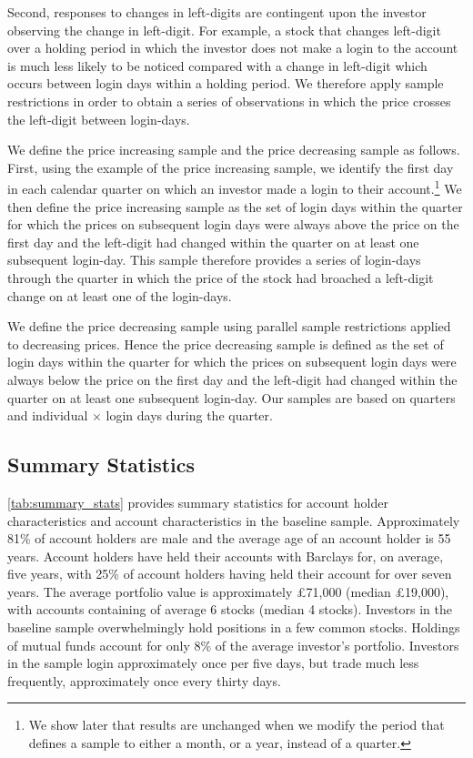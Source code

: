 Second, responses to changes in left-digits are contingent upon the investor observing the change in left-digit. For example, a stock that changes left-digit over a holding period in which the investor does not make a login to the account is much less likely to be noticed compared with a change in left-digit which occurs between login days within a holding period. We therefore apply sample restrictions in order to obtain a series of observations in which the price crosses the left-digit between login-days.

We define the price increasing sample and the price decreasing sample as follows. First, using the example of the price increasing sample, we identify the first day in each calendar quarter on which an investor made a login to their account.\footnote{We show later that results are unchanged when we modify the period that defines a sample to either a month, or a year, instead of a quarter.} We then define the price increasing sample as the set of login days within the quarter for which the prices on subsequent login days were always above the price on the first day and the left-digit had changed within the quarter on at least one subsequent login-day. This sample therefore provides a series of login-days through the quarter in which the price of the stock had broached a left-digit change on at least one of the login-days. 

We define the price decreasing sample using parallel sample restrictions applied to decreasing prices. Hence the price decreasing sample is defined as the set of login days within the quarter for which the prices on subsequent login days were always below the price on the first day and the left-digit had changed within the quarter on at least one subsequent login-day. Our samples are based on quarters and individual $\times$  login days during the quarter. 

\subsection{Summary Statistics}

\ref{tab:summary_stats} provides summary statistics for account holder characteristics and account characteristics in the baseline sample. Approximately 81\% of account holders are male and the average age of an account holder is 55 years. Account holders have held their accounts with Barclays for, on average, five years, with 25\% of account holders having held their account for over seven years. The average portfolio value is approximately \pounds71,000 (median \pounds19,000), with accounts containing of average 6 stocks (median 4 stocks). Investors in the baseline sample overwhelmingly hold positions in a few common stocks. Holdings of mutual funds account for only 8\% of the average investor's portfolio. Investors in the sample login approximately once per five days, but trade much less frequently, approximately once every thirty days.

